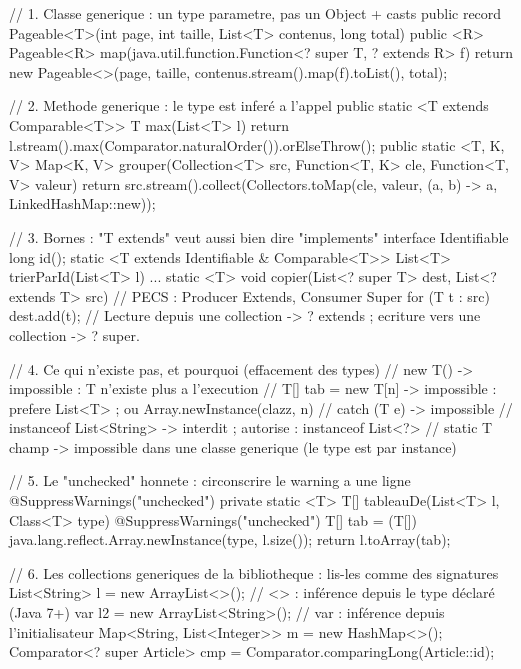 \documentclass[12pt,a4paper,twoside,openright]{book}
\begin{document}
\begin{codejava}
// 1. Classe generique : un type parametre, pas un Object + casts
public record Pageable<T>(int page, int taille, List<T> contenus, long total) {
    public <R> Pageable<R> map(java.util.function.Function<? super T, ? extends R> f) {
        return new Pageable<>(page, taille, contenus.stream().map(f).toList(), total);
    }
}

// 2. Methode generique : le type est infer\'e a l'appel
public static <T extends Comparable<T>> T max(List<T> l) {
    return l.stream().max(Comparator.naturalOrder()).orElseThrow();
}
public static <T, K, V> Map<K, V> grouper(Collection<T> src, Function<T, K> cle, Function<T, V> valeur) {
    return src.stream().collect(Collectors.toMap(cle, valeur, (a, b) -> a, LinkedHashMap::new));
}

// 3. Bornes : "T extends" veut aussi bien dire "implements"
interface Identifiable { long id(); }
static <T extends Identifiable & Comparable<T>> List<T> trierParId(List<T> l) { ... }
static <T> void copier(List<? super T> dest, List<? extends T> src) {   // PECS : Producer Extends, Consumer Super
    for (T t : src) { dest.add(t); }
}
// Lecture depuis une collection -> ? extends ; ecriture vers une collection -> ? super.

// 4. Ce qui n'existe pas, et pourquoi (effacement des types)
// new T()            -> impossible : T n'existe plus a l'execution
// T[] tab = new T[n] -> impossible : prefere List<T> ; ou Array.newInstance(clazz, n)
// catch (T e)        -> impossible
// instanceof List<String> -> interdit ; autorise : instanceof List<?>
// static T champ     -> impossible dans une classe generique (le type est par instance)

// 5. Le "unchecked" honnete : circonscrire le warning a une ligne
@SuppressWarnings("unchecked")
private static <T> T[] tableauDe(List<T> l, Class<T> type) {
    @SuppressWarnings("unchecked")
    T[] tab = (T[]) java.lang.reflect.Array.newInstance(type, l.size());
    return l.toArray(tab);
}

// 6. Les collections generiques de la bibliotheque : lis-les comme des signatures
List<String> l = new ArrayList<>();          // <> : inf\'erence depuis le type d\'eclar\'e (Java 7+)
var l2 = new ArrayList<String>();             // var : inf\'erence depuis l'initialisateur
Map<String, List<Integer>> m = new HashMap<>();
Comparator<? super Article> cmp = Comparator.comparingLong(Article::id);
\end{codejava}
\end{document}

